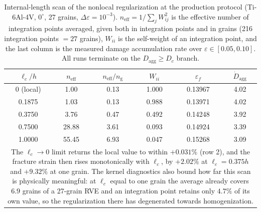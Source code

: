 \documentclass[11pt,a4paper,twocolumn]{article}
\providecommand{\ang}[1]{\ensuremath{#1^{\circ}}}
\begin{document}
\begin{table}[htbp]
\centering
\caption{Internal-length scan of the nonlocal regularization at the production protocol (Ti-6Al-4V, $\ang{0}$,
27 grains, $\Delta\varepsilon = 10^{-3}$). $n_{\mathrm{eff}} = 1/\sum_j W_{ij}^2$ is the effective number of
integration points averaged, given both in integration points and in grains (216 integration points $= 27$
grains), $W_{ii}$ is the self-weight of an integration point, and the last column is the measured damage
accumulation rate over $\varepsilon \in [0.05, 0.10]$. All runs terminate on the $D_{\mathrm{agg}} \ge D_c$
branch.}
\label{tab:nonlocal_lc}
\footnotesize
\setlength{\tabcolsep}{3pt}
\begin{tabular}{cccccc}
\toprule
$\ell_c/h$ & $n_{\mathrm{eff}}$ & $n_{\mathrm{eff}}/n_{\mathrm{g}}$ & $W_{ii}$ & $\varepsilon_f$ & $\dot{D}_{\mathrm{agg}}$ \\
\midrule
0 (local) & 1.00 & 0.13 & 1.000 & 0.13967 & 4.02 \\
0.1875 & 1.03 & 0.13 & 0.988 & 0.13971 & 4.02 \\
0.3750 & 3.76 & 0.47 & 0.492 & 0.14248 & 3.92 \\
0.7500 & 28.88 & 3.61 & 0.093 & 0.14924 & 3.39 \\
1.0000 & 55.45 & 6.93 & 0.047 & 0.15268 & 3.09 \\
\bottomrule
\multicolumn{6}{p{0.97\columnwidth}}{\footnotesize The $\ell_c \to 0$ limit returns the local value to within
$+0.031\%$ (row 2), and the fracture strain then rises monotonically with $\ell_c$, by $+2.02\%$ at
$\ell_c = 0.375h$ and $+9.32\%$ at one grain. The kernel diagnostics also bound how far this scan is
physically meaningful: at $\ell_c$ equal to one grain the average already covers $6.9$ grains of a 27-grain
RVE and an integration point retains only $4.7\%$ of its own value, so the regularization there has
degenerated towards homogenization.}
\end{tabular}
\end{table}
\end{document}
